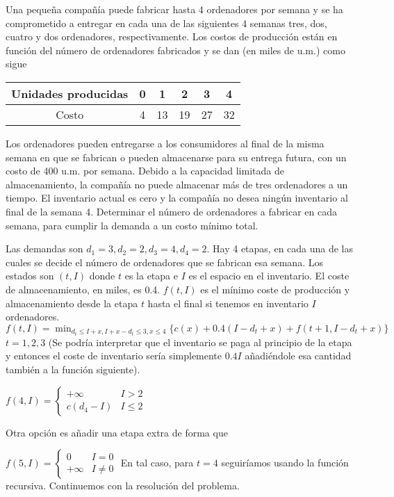 \documentclass[twoside]{article}
\begin{document}
\newpage 
\begin{ejercicio}{3}
Una pequeña compañía puede fabricar hasta 4 ordenadores por semana y se ha comprometido
a entregar en cada una de las siguientes 4 semanas tres, dos, cuatro y dos ordenadores, respectivamente.
Los costos de producción están en función del número de ordenadores fabricados y se dan
(en miles de u.m.) como sigue

\begin{tabular}{c| c c c c c}
Unidades producidas & 0 & 1 & 2 & 3 & 4 \\
\hline
Costo & 4 & 13 & 19 & 27 & 32
\end{tabular}

Los ordenadores pueden entregarse a los consumidores al final de la misma semana en que se
fabrican o pueden almacenarse para su entrega futura, con un costo de 400 u.m. por semana.
Debido a la capacidad limitada de almacenamiento, la compañía no puede almacenar más de tres
ordenadores a un tiempo. El inventario actual es cero y la compañía no desea ningún inventario
al final de la semana 4. Determinar el número de ordenadores a fabricar en cada semana, para
cumplir la demanda a un costo mínimo total.
\begin{solucion}
Las demandas son $d_1=3, d_2=2, d_3=4, d_4=2$. Hay 4 etapas, en cada una de las cuales se decide el número de ordenadores que se fabrican esa semana. Los estados son $(t, I)$ donde $t$ es la etapa e $I$ es el espacio en el inventario. El coste de almacenamiento, en miles, es 0.4. $f(t,I)$ es el mínimo coste de producción y almacenamiento desde la etapa $t$ hasta el final si tenemos en inventario $I$ ordenadores.
$f(t,I)=\min_{d_t\leq I+x, I+x-d_t\leq 3,x\leq 4}\{c(x)+0.4(I-d_t+x)+f(t+1,I-d_t+x)\}$ $t=1,2,3$ (Se podría interpretar que el inventario se paga al principio de la etapa y entonces el coste de inventario sería simplemente $0.4I$ añadiéndole esa cantidad también a la función siguiente). 

$f(4,I)=\begin{cases}
+\infty & I>2\\
c(d_4-I) & I\leq 2
\end{cases}$

Otra opción es añadir una etapa extra de forma que 

$f(5,I)=\begin{cases}
0 & I=0\\
+\infty & I\neq 0
\end{cases}$
En tal caso, para $t=4$ seguiríamos usando la función recursiva. Continuemos con la resolución del problema.


\end{solucion}
\end{ejercicio}
\end{document}
